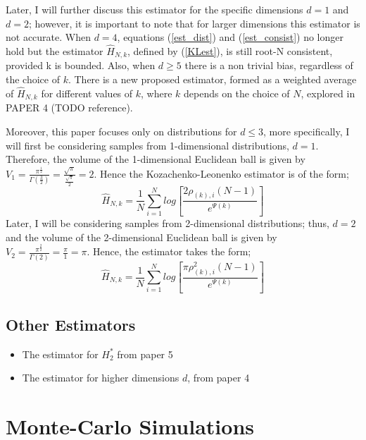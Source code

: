 \documentclass{article}
\begin{document}
Later, I will further discuss this estimator for the specific dimensions $d=1$ and $d=2$; however, it is important to note that for larger dimensions this estimator is not accurate. When $d=4$, equations (\ref{est_dist}) and (\ref{est_consist}) no longer hold but the estimator $\hat{H}_{N, k}$, defined by (\ref{KLest}), is still root-N consistent, provided k is bounded. Also, when $d \geq 5$ there is a non trivial bias, regardless of the choice of $k$. There is a new proposed estimator, formed as a weighted average of $\hat{H}_{N, k}$ for different values of $k$, where $k$ depends on the choice of $N$, explored in PAPER 4 (TODO reference). 

Moreover, this paper focuses only on distributions for $d \leq 3$, more specifically, I will first be considering samples from 1-dimensional distributions, $d=1$. Therefore, the volume of the 1-dimensional Euclidean ball is given by $V_{1} = \frac{\pi^{\frac{1}{2}}}{\Gamma (\frac{3}{2})} = \frac{\sqrt{\pi}}{\frac{\sqrt{\pi}}{2}} = 2$. Hence the Kozachenko-Leonenko estimator is of the form;
\begin{equation} \label{KLest_d=1}
\hat{H}_{N, k} = \frac{1}{N} \sum_{i=1}^{N} log \left[ \frac{2\rho_{(k),i}(N-1)}{e^{\Psi(k)}} \right]
\end{equation}
 Later, I will be considering samples from 2-dimensional distributions; thus, $d=2$ and the volume of the 2-dimensional Euclidean ball is given by $V_{2} = \frac{\pi^{\frac{2}{2}}}{\Gamma (2)} = \frac{\pi}{1} = \pi$. Hence, the estimator takes the form;
\begin{equation} \label{KLest_d=2}
\hat{H}_{N, k} = \frac{1}{N} \sum_{i=1}^{N} log \left[ \frac{\pi \rho_{(k),i}^{2} (N-1)}{e^{\Psi(k)}} \right]
\end{equation}



\subsection{Other Estimators}
\begin{itemize}
\item The estimator for $H_{2}^{*}$ from paper 5
\item The estimator for higher dimensions $d$, from paper 4
\end{itemize}



\section{Monte-Carlo Simulations}
\end{document}
